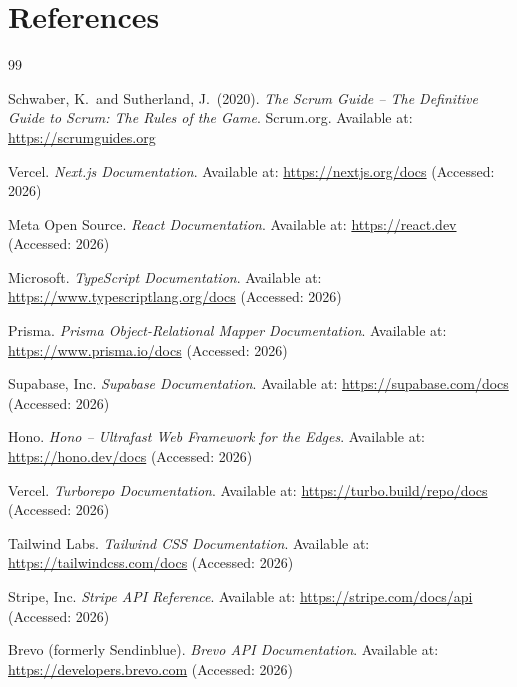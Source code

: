 \documentclass[12pt,a4paper]{report}
\begin{document}
\chapter*{References}
{}

\begin{thebibliography}{99}

    Schwaber, K.\ and Sutherland, J.\ (2020).
    \textit{The Scrum Guide -- The Definitive Guide to Scrum: The Rules of the Game}.
    Scrum.org.
    Available at: \url{https://scrumguides.org}

    Vercel.
    \textit{Next.js Documentation}.
    Available at: \url{https://nextjs.org/docs}
    (Accessed: 2026)

    Meta Open Source.
    \textit{React Documentation}.
    Available at: \url{https://react.dev}
    (Accessed: 2026)

    Microsoft.
    \textit{TypeScript Documentation}.
    Available at: \url{https://www.typescriptlang.org/docs}
    (Accessed: 2026)

    Prisma.
    \textit{Prisma Object-Relational Mapper Documentation}.
    Available at: \url{https://www.prisma.io/docs}
    (Accessed: 2026)

    Supabase, Inc.
    \textit{Supabase Documentation}.
    Available at: \url{https://supabase.com/docs}
    (Accessed: 2026)

    Hono.
    \textit{Hono -- Ultrafast Web Framework for the Edges}.
    Available at: \url{https://hono.dev/docs}
    (Accessed: 2026)

    Vercel.
    \textit{Turborepo Documentation}.
    Available at: \url{https://turbo.build/repo/docs}
    (Accessed: 2026)

    Tailwind Labs.
    \textit{Tailwind CSS Documentation}.
    Available at: \url{https://tailwindcss.com/docs}
    (Accessed: 2026)

    Stripe, Inc.
    \textit{Stripe API Reference}.
    Available at: \url{https://stripe.com/docs/api}
    (Accessed: 2026)

    Brevo (formerly Sendinblue).
    \textit{Brevo API Documentation}.
    Available at: \url{https://developers.brevo.com}
    (Accessed: 2026)


\end{thebibliography}
\end{document}
